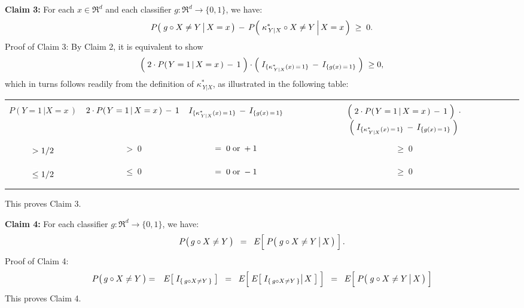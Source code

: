 \vskip 0.8cm
\noindent
\textbf{Claim 3:}\; For each $x \in \Re^{d}$ and each classifier $g : \Re^{d} \longrightarrow \{0,1\}$, we have:
\begin{equation*}
P\!\left(\,\left. g \overset{{\color{white}.}}{\circ} X \neq Y \,\right\vert X = x \,\right)
\, - \,
P\!\left(\,\left. \kappa^{*}_{\,Y \vert X} \overset{{\color{white}.}}{\circ} X \neq Y \,\right\vert X = x \,\right) \; \geq \; 0.
\end{equation*}
Proof of Claim 3:\;
By Claim 2, it is equivalent to show
\begin{equation*}
\left(\; 2 \cdot P\!\left(\left.Y=1\,\right\vert X =x \,\right) \,\overset{{\color{white}.}}{-}\, 1 \;\right)
\cdot
\left(\; I_{\{\kappa^{*}_{\,Y \vert X}(x)\,=\,1\}} \,\overset{{\color{white}.}}{-}\, I_{\{g(x)\,=\,1\}} \;\right) \; \geq 0,
\end{equation*}
which in turns follows readily from the definition of $\kappa^{*}_{\,Y \vert X}$, as illustrated in the following table:
{\footnotesize
\begin{center}
\begin{tabular}{|c||c|c|c|}
\hline
&&&\\
	$P\!\left(\left.Y=1\,\right\vert X =x \,\right)$ &
	$2 \cdot P\!\left(\left.Y=1\,\right\vert X =x \,\right) \,\overset{{\color{white}.}}{-}\, 1$ &
	$I_{\{\kappa^{*}_{\,Y \vert X}(x)\,=\,1\}} \,\overset{{\color{white}.}}{-}\, I_{\{g(x)\,=\,1\}}$ &
	{\tiny$\left(\; 2 \cdot P\!\left(\left.Y=1\,\right\vert X =x \,\right) \,\overset{{\color{white}.}}{-}\, 1 \;\right)$
	$\cdot$
	$\left(\; I_{\{\kappa^{*}_{\,Y \vert X}(x)\,=\,1\}} \,\overset{{\color{white}.}}{-}\, I_{\{g(x)\,=\,1\}} \;\right)$}
\\
&&&\\
\hline
	$\underset{{\color{white}-}}{\overset{{\color{white}-}}{>} 1/2}$ &
	$ >\; 0 $ &
	$ =\; 0 \;\textnormal{or}\; +1$ &
	$ \geq\; 0 $
\\
\hline
	$\underset{{\color{white}-}}{\overset{{\color{white}-}}{\leq} 1/2}$ &
	$ \leq\; 0$ &
	$ =\; 0 \;\textnormal{or}\; -1$ &
	$ \geq\; 0 $
\\
\hline
\end{tabular}
\end{center}
}
\noindent
This proves Claim 3.

\vskip 0.8cm
\noindent
\textbf{Claim 4:}\;
For each classifier $g : \Re^{d} \longrightarrow \{0,1\}$, we have:
\begin{equation*}
P\!\left(\,g\overset{{\color{white}.}}{\circ}X \neq Y\,\right)
\;\;=\;\;
E\!\left[\;\overset{{\color{white}.}}{P}\!\left(\,\left. g \overset{{\color{white}.}}{\circ} X \neq Y \,\right\vert X \,\right)\;\right].
\end{equation*}
Proof of Claim 4:\;
\begin{eqnarray*}
P\!\left(\,g\overset{{\color{white}.}}{\circ}X \neq Y\,\right)
&=&
	E\!\left[\; I_{\{\,g \circ X \neq Y\,\}} \;\right]
\;\; = \;\;
	E\!\left[\; \overset{{\color{white}.}}{E}\!\left[\, \left. I_{\{\,g \circ X \neq Y\,\}} \right\vert X \;\right] \;\right]
\;\; = \;\;
	E\!\left[\;\overset{{\color{white}.}}{P}\!\left(\,\left. g \overset{{\color{white}.}}{\circ} X \neq Y \,\right\vert X \,\right)\;\right]
\end{eqnarray*}
This proves Claim 4.

